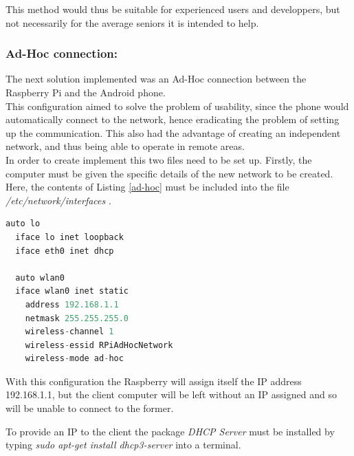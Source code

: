 This method would thus be suitable for experienced users and developpers, but not necessarily for the average seniors it is intended to help.







\subsubsection{Ad-Hoc connection:}

The next solution implemented was an Ad-Hoc connection between the Raspberry Pi and the Android phone.\\

This configuration aimed to solve the problem of usability, since the phone would automatically connect to the network, hence eradicating the problem of setting up the communication.  This also had the advantage of creating an independent network, and thus being able to operate in remote areas. \\

In order to create implement this two files need to be set up. Firstly, the computer must be given the specific details of the new network to be created. Here, the contents of Listing \ref{ad-hoc} must be included into the file \textit{/etc/network/interfaces} . \\

	\begin{minipage}{\linewidth}%
	\begin{lstlisting}[label=ad-hoc,caption=Ad-Hoc Configuration {[} /etc/network/interfaces {]} ,language=python ]
  auto lo
  iface lo inet loopback
  iface eth0 inet dhcp
 
  auto wlan0
  iface wlan0 inet static
    address 192.168.1.1
    netmask 255.255.255.0
    wireless-channel 1
    wireless-essid RPiAdHocNetwork
    wireless-mode ad-hoc
	\end{lstlisting}
	\end{minipage}

\bigskip
With this configuration the Raspberry will assign itself the IP address 192.168.1.1, but the client computer will be left without an IP assigned and so will be unable to connect to the former. 

To provide an IP to the client the package \textit{DHCP Server} must be installed by typing \textit{sudo apt-get install dhcp3-server} into a terminal. \\

